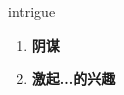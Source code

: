 
\begin{frame}
{\huge intrigue}
\begin{center}
\begin{enumerate}\Large
  \item \textbf{阴谋}
  \item \textbf{激起...的兴趣}
\end{enumerate}
\end{center}
\end{frame}
